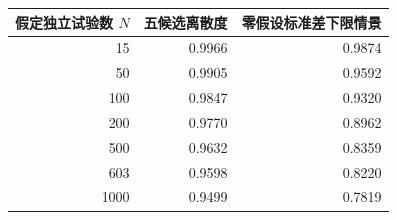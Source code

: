\begin{tabular}{@{}rrr@{}}
\toprule
假定独立试验数 $N$ & 五候选离散度 & 零假设标准差下限情景 \\
\midrule
15 & 0.9966 & 0.9874 \\
50 & 0.9905 & 0.9592 \\
100 & 0.9847 & 0.9320 \\
200 & 0.9770 & 0.8962 \\
500 & 0.9632 & 0.8359 \\
603 & 0.9598 & 0.8220 \\
1000 & 0.9499 & 0.7819 \\
\bottomrule
\end{tabular}